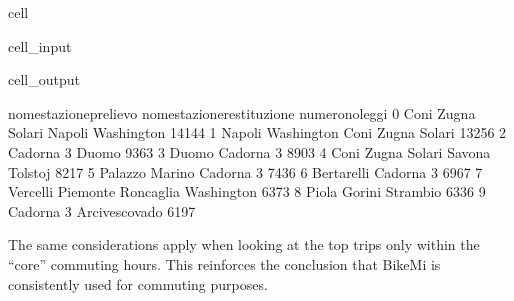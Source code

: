 \documentclass[letterpaper,10pt,english]{jupyterBook}
\begin{document}
\begin{sphinxuseclass}{cell}
\begin{sphinxuseclass}{cell_input}
\begin{sphinxVerbatim}[commandchars=\\\{\}]
      


\end{sphinxVerbatim}

\end{sphinxuseclass}
\begin{sphinxuseclass}{cell_output}
\begin{sphinxVerbatim}[commandchars=\\\{\}]
  nome\PYGZus{}stazione\PYGZus{}prelievo nome\PYGZus{}stazione\PYGZus{}restituzione  numero\PYGZus{}noleggi
0      Coni Zugna Solari        Napoli \PYGZhy{} Washington           14144
1    Napoli \PYGZhy{} Washington          Coni Zugna Solari           13256
2              Cadorna 3                      Duomo            9363
3                  Duomo                  Cadorna 3            8903
4      Coni Zugna Solari           Savona \PYGZhy{} Tolstoj            8217
5         Palazzo Marino                  Cadorna 3            7436
6             Bertarelli                  Cadorna 3            6967
7    Vercelli \PYGZhy{} Piemonte     Roncaglia \PYGZhy{} Washington            6373
8                  Piola          Gorini \PYGZhy{} Strambio            6336
9              Cadorna 3              Arcivescovado            6197
\end{sphinxVerbatim}

\end{sphinxuseclass}
\end{sphinxuseclass}
\sphinxAtStartPar
The same considerations apply when looking at the top trips only within the “core” commuting hours. This reinforces the conclusion that BikeMi is consistently used for commuting purposes.
\end{document}
